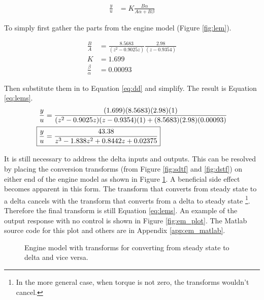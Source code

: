 \documentclass{article}
\begin{document}
\begin{align}
\frac{y}{u} &= K \frac{B \alpha}{A \alpha + B \beta} \label{eq:dd}
\end{align}

To simply first gather the parts from the engine model (Figure \ref{fig:lem}).

\begin{align*}
	\frac{B}{A} &= \frac{8.5683}{(z^2 - 0.9025z)} \frac{2.98}{(z - 0.9354)} \\
	K &= 1.699 \\
	\frac{\beta}{\alpha} &= 0.00093 
\end{align*}

\begin{samepage}
Then substitute them in to Equation \ref{eq:dd} and simplify.
The result is Equation \ref{eq:lems}.
\begin{align}
	\frac{y}{u} &= \frac{(1.699) (8.5683) (2.98) (1)}
		{(z^2 - 0.9025z)(z - 0.9354)(1) + (8.5683)(2.98)(0.00093)} \notag \\
	\Aboxed{ \frac{y}{u} &= \frac{43.38}{z^3 - 1.838 z^2 + 0.8442 z + 0.02375}}
		\label{eq:lems}
\end{align}
\end{samepage}

\begin{samepage}
It is still necessary to address the delta inputs and outputs.
This can be resolved by placing the conversion transforms
(from Figure \ref{fig:sdtf} and \ref{fig:dstf}) on either
end of the engine model as shown in Figure \ref{fig:nodelta}.
A beneficial side effect becomes apparent in this form.
The transform that converts from steady state to a delta cancels
with the transform that converts from a delta to steady state
\footnote{In the more general case, when torque is not zero,
the transforms wouldn't cancel.}.
Therefore the final transform is still Equation \ref{eq:lems}.
An example of the output response with no control is shown in
Figure \ref{fig:em_plot}.
The Matlab source code for this plot and others are
in Appendix \ref{app:em_matlab}.
\end{samepage}

\begin{figure}[!htbp]

\begin{center}
\end{center}

\caption{Engine model with transforms for converting from steady state
to delta and vice versa.}
\label{fig:nodelta}

\end{figure}
\end{document}
